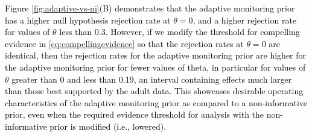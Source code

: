 \documentclass[12pt]{article}
\begin{document}
\begin{mdframed}[hidealllines=true,backgroundcolor=yellow]
\textcolor{black}{Figure \ref{fig:adaptive-vs-ni}(B) demonstrates that the adaptive monitoring prior has a higher null hypothesis rejection rate at $\theta=0$, and a higher rejection rate for values of $\theta$ less than 0.3. However, if we modify the threshold for compelling evidence in \eqref{eq:compellingevidence} so that the rejection rates at $\theta=0$ are identical, then the rejection rates for the adaptive monitoring prior are higher for the adaptive monitoring prior for fewer values of theta, in particular for values of $\theta$ greater than 0 and less than 0.19, an interval containing effects much larger than those best supported by the adult data. This showcases desirable operating characteristics of the adaptive monitoring prior as compared to a non-informative prior, even when the required evidence threshold for analysis with the non-informative prior is modified (i.e., lowered).}

\end{mdframed}

\end{document}

